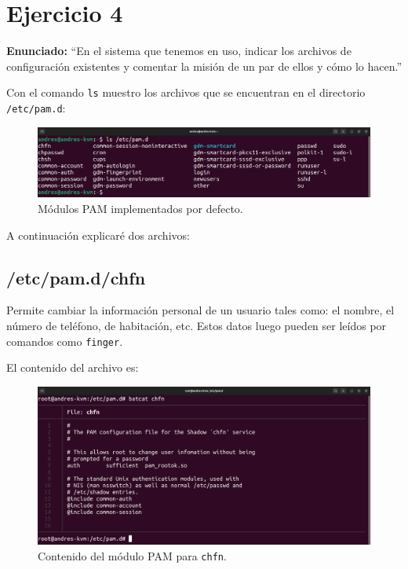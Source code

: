 \documentclass{article}
\begin{document}
\section{Ejercicio 4}

\textbf{Enunciado: }``En el sistema que tenemos en uso, indicar los archivos de configuración existentes y comentar la misión de un par de ellos y cómo lo hacen.''

\bigskip

Con el comando \verb|ls| muestro los archivos que se encuentran en el directorio \verb|/etc/pam.d|:

\begin{figure}[H]
    \includegraphics[width=\textwidth]{imagenes/lspam.png}
    \caption{Módulos PAM implementados por defecto.}
\end{figure}

A continuación explicaré dos archivos:

\subsection{/etc/pam.d/chfn}
Permite cambiar la información personal de un usuario tales como: el nombre, el número de teléfono, de habitación, etc. Estos datos luego pueden ser leídos por comandos como \verb|finger|.

\bigskip

El contenido del archivo es:

\begin{figure}[H]
    \includegraphics[width=\textwidth]{imagenes/pamchfn.png}
    \caption{Contenido del módulo PAM para \texttt{chfn}.}
\end{figure}
\end{document}
